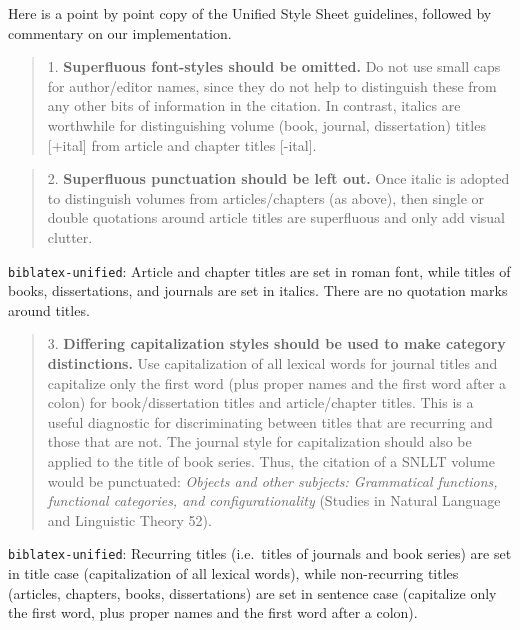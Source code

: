 \documentclass[
]{article}
\begin{document}
Here is a point by point copy of the Unified Style Sheet guidelines,
followed by commentary on our implementation.

\begin{quote}
1. \textbf{Superfluous font-styles should be omitted.} Do not use small
caps for author/editor names, since they do not help to distinguish
these from any other bits of information in the citation. In contrast,
italics are worthwhile for distinguishing volume (book, journal,
dissertation) titles {[}+ital{]} from article and chapter titles
{[}-ital{]}.
\end{quote}

\begin{quote}
2. \textbf{Superfluous punctuation should be left out.} Once italic is
adopted to distinguish volumes from articles/chapters (as above), then
single or double quotations around article titles are superfluous and
only add visual clutter.
\end{quote}

\texttt{biblatex-unified}: Article and chapter titles are set in roman
font, while titles of books, dissertations, and journals are set in
italics. There are no quotation marks around titles.

\begin{quote}
3. \textbf{Differing capitalization styles should be used to make
category distinctions.} Use capitalization of all lexical words for
journal titles and capitalize only the first word (plus proper names and
the first word after a colon) for book/dissertation titles and
article/chapter titles. This is a useful diagnostic for discriminating
between titles that are recurring and those that are not. The journal
style for capitalization should also be applied to the title of book
series. Thus, the citation of a SNLLT volume would be punctuated:
\emph{Objects and other subjects: Grammatical functions, functional
categories, and configurationality} (Studies in Natural Language and
Linguistic Theory 52).
\end{quote}

\texttt{biblatex-unified}: Recurring titles (i.e.~titles of journals and
book series) are set in title case (capitalization of all lexical
words), while non-recurring titles (articles, chapters, books,
dissertations) are set in sentence case (capitalize only the first word,
plus proper names and the first word after a colon).
\end{document}
